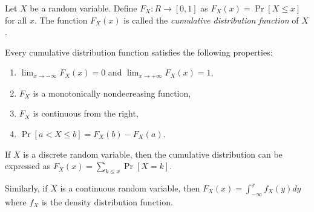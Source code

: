 \documentclass[12pt]{article}
\DeclareMathOperator{\Prb}{Pr}
\begin{document}
Let $X$ be a random variable. Define $F_X\colon R \to [0,1] $ as
$F_X(x) = \Prb[X \leq x]$
for all $x$. The function $F_X(x)$ is called the \emph{cumulative distribution function} of $X$.

Every cumulative distribution function satisfies the following properties:
\begin{enumerate}
\item $\lim_{x \to -\infty}{F_X(x)}=0$  and  $\lim_{x \to +\infty}{F_X(x)}=1$,
\item $F_X$ is a monotonically nondecreasing function,
\item $F_X$ is continuous from the right,
\item $\Prb[a < X \leq b] = F_X(b) - F_X(a)$.
\end{enumerate}

If $X$ is a discrete random variable, then the cumulative distribution can be expressed as
$F_X(x) = \sum_{k\leq x} \Prb[X = k]$.

Similarly, if $X$ is a continuous random variable, then
$F_X(x) = \int_{-\infty}^{x} f_X(y) dy$ where $f_X$ is the density distribution function.


%
%
%
\end{document}
